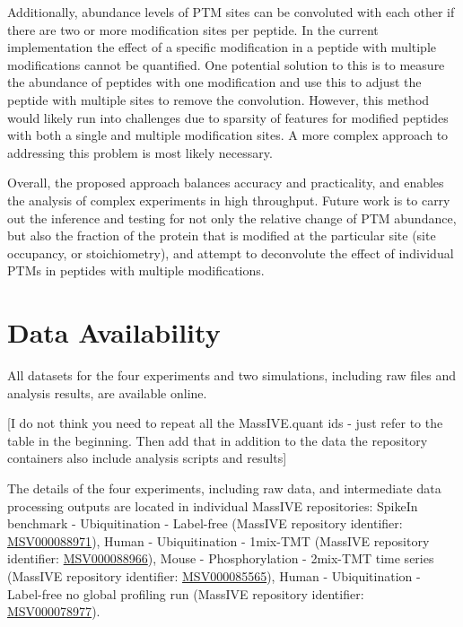 \documentclass[mcp]{article}
\numberwithin{table}{section}
\def\todo#1{{\color{red}[#1]}}
\begin{document}
Additionally, abundance levels of PTM sites can be convoluted with each other if there are two or more modification sites per peptide. In the current implementation the effect of a specific modification in a peptide with multiple modifications cannot be quantified. One potential solution to this is to measure the abundance of peptides with one modification and use this to adjust the peptide with multiple sites to remove the convolution. However, this method would likely run into challenges due to sparsity of features for modified peptides with both a single and multiple modification sites. A more complex approach to addressing this problem is most likely necessary.

Overall, the proposed approach balances accuracy and practicality, and enables the analysis of complex experiments in high throughput. Future work is to carry out the inference and testing for not only the relative change of PTM abundance, but also the fraction of the protein that is modified at the particular site (site occupancy, or stoichiometry), and attempt to deconvolute the effect of individual PTMs in peptides with multiple modifications.

\section{Data Availability}

All datasets for the four experiments and two simulations, including raw files and analysis results, are available online.

\todo{I do not think you need to repeat all the MassIVE.quant ids - just refer to the table in the beginning. Then add that in addition to the data the repository containers also include analysis scripts and results}

The details of the four experiments, including raw data, and intermediate data processing outputs are located in individual MassIVE repositories: SpikeIn benchmark - Ubiquitination - Label-free (MassIVE repository identifier: \href{https://massive.ucsd.edu/ProteoSAFe/private-dataset.jsp?task=c4c583ecf7f941cdac87f7a4f872517b}{MSV000088971}), Human - Ubiquitination - 1mix-TMT (MassIVE repository identifier: \href{https://massive.ucsd.edu/ProteoSAFe/dataset.jsp?task=b6f0c74c234247678fb0888c6df1f225}{MSV000088966}), Mouse - Phosphorylation - 2mix-TMT time series (MassIVE repository identifier: \href{https://massive.ucsd.edu/ProteoSAFe/dataset.jsp?task=4878d777c6b34cf8aaf8477e93140c4d}{MSV000085565}), Human - Ubiquitination - Label-free no global profiling run (MassIVE repository identifier: \href{https://massive.ucsd.edu/ProteoSAFe/dataset.jsp?task=1b516164de5345108b40b75147dd58b5}{MSV000078977}).
\end{document}
